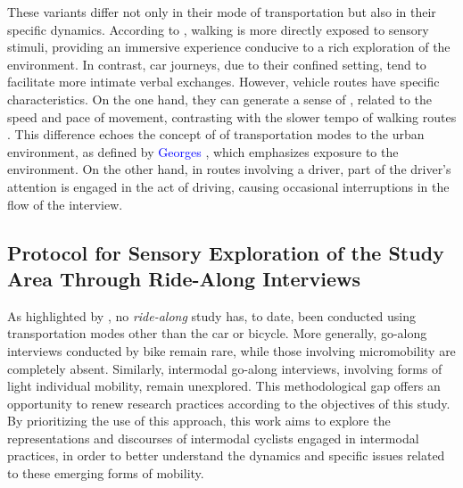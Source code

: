 \begin{refsegment}
These variants differ not only in their mode of transportation but also in their specific dynamics. According to \textcolor{blue}{\textcite[120]{bergeron_uncovering_2014}}, walking is more directly exposed to sensory stimuli, providing an immersive experience conducive to a rich exploration of the environment. In contrast, car journeys, due to their confined setting, tend to facilitate more intimate verbal exchanges. However, vehicle routes have specific characteristics. On the one hand, they can generate a sense of , related to the speed and pace of movement, contrasting with the slower tempo of walking routes \textcolor{blue}{\autocite[12]{despres_replacer_2019}}. This difference echoes the concept of  of transportation modes to the urban environment, as defined by \textcolor{blue}{Georges} \textcolor{blue}{\textcite[222]{amar_homo_2016}}, which emphasizes exposure to the environment. On the other hand, in routes involving a driver, part of the driver’s attention is engaged in the act of driving, causing occasional interruptions in the flow of the interview.%

\subsection{Protocol for Sensory Exploration of the Study Area Through Ride-Along Interviews
    \label{chap3:parcours-commente-administration}
    }

As highlighted by \textcolor{blue}{\textcite[11]{despres_replacer_2019}}, no \textsl{ride-along} study has, to date, been conducted using transportation modes other than the car or bicycle. More generally, go-along interviews conducted by bike remain rare, while those involving micromobility are completely absent. Similarly, intermodal go-along interviews, involving forms of light individual mobility, remain unexplored. This methodological gap offers an opportunity to renew research practices according to the objectives of this study. By prioritizing the use of this approach, this work aims to explore the representations and discourses of intermodal cyclists engaged in intermodal practices, in order to better understand the dynamics and specific issues related to these emerging forms of mobility.%


\end{refsegment}
